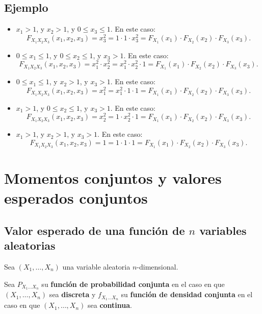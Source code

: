 \documentclass[]{book}
\begin{document}
\hypertarget{ejemplo-126}{%
\subsection{Ejemplo}\label{ejemplo-126}}

\begin{itemize}
\item
  \(x_1> 1\), y \(x_2> 1\), y \(0\leq x_3\leq 1\). En este caso:
  \[
  F_{X_1X_2X_3}(x_1,x_2,x_3)=x_3^2=1\cdot 1\cdot x_3^2= F_{X_1}(x_1)\cdot F_{X_2}(x_2)\cdot F_{X_3}(x_3).
  \]
\item
  \(0\leq x_1\leq 1\), y \(0\leq x_2\leq 1\), y \(x_3> 1\). En este caso:
  \[
  F_{X_1X_2X_3}(x_1,x_2,x_3)=x_1^2\cdot x_2^2=x_1^2\cdot x_2^2\cdot 1= F_{X_1}(x_1)\cdot F_{X_2}(x_2)\cdot F_{X_3}(x_3).
  \]
\item
  \(0\leq x_1\leq 1\), y \(x_2 > 1\), y \(x_3> 1\). En este caso:
  \[
  F_{X_1X_2X_3}(x_1,x_2,x_3)=x_1^2=x_1^2\cdot 1\cdot 1= F_{X_1}(x_1)\cdot F_{X_2}(x_2)\cdot F_{X_3}(x_3).
  \]
\item
  \(x_1> 1\), y \(0\leq x_2 \leq 1\), y \(x_3> 1\). En este caso:
  \[
  F_{X_1X_2X_3}(x_1,x_2,x_3)=x_2^2=1\cdot x_2^2\cdot 1= F_{X_1}(x_1)\cdot F_{X_2}(x_2)\cdot F_{X_3}(x_3).
  \]
\item
  \(x_1> 1\), y \(x_2>1\), y \(x_3> 1\). En este caso:
  \[
  F_{X_1X_2X_3}(x_1,x_2,x_3)=1=1\cdot 1\cdot 1= F_{X_1}(x_1)\cdot F_{X_2}(x_2)\cdot F_{X_3}(x_3).
  \]
\end{itemize}

\hypertarget{momentos-conjuntos-y-valores-esperados-conjuntos-1}{%
\section{Momentos conjuntos y valores esperados conjuntos}\label{momentos-conjuntos-y-valores-esperados-conjuntos-1}}

\hypertarget{valor-esperado-de-una-funciuxf3n-de-n-variables-aleatorias}{%
\subsection{\texorpdfstring{Valor esperado de una función de \(n\) variables aleatorias}{Valor esperado de una función de n variables aleatorias}}\label{valor-esperado-de-una-funciuxf3n-de-n-variables-aleatorias}}

Sea \((X_1,\ldots,X_n)\) una variable aleatoria \(n\)-dimensional.

Sea \(P_{X_1\ldots X_n}\) su \textbf{función de probabilidad conjunta} en el caso en que \((X_1,\ldots,X_n)\) sea \textbf{discreta} y \(f_{X_1\ldots X_n}\) su \textbf{función de densidad conjunta} en el caso en que \((X_1,\ldots,X_n)\) sea \textbf{continua}.
\end{document}
